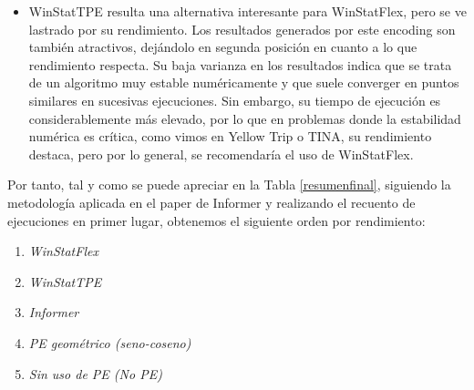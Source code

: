 \begin{itemize}
	 \item WinStatTPE resulta una alternativa interesante para WinStatFlex, pero se ve lastrado por su rendimiento. Los resultados generados por este encoding son también atractivos, dejándolo en segunda posición en cuanto a lo que rendimiento respecta. Su baja varianza en los resultados indica que se trata de un algoritmo muy estable numéricamente y que suele converger en puntos similares en sucesivas ejecuciones. Sin embargo, su tiempo de ejecución es considerablemente más elevado, por lo que en problemas donde la estabilidad numérica es crítica, como vimos en Yellow Trip o TINA, su rendimiento destaca, pero por lo general, se recomendaría el uso de WinStatFlex.
\end{itemize}

Por tanto, tal y como se puede apreciar en la Tabla \ref{resumenfinal}, siguiendo la metodología aplicada en el paper de Informer\cite{zhou2021informerefficienttransformerlong} y realizando el recuento de ejecuciones en primer lugar, obtenemos el siguiente orden por rendimiento:

\begin{enumerate}
	\item \textit{WinStatFlex}
	\item \textit{WinStatTPE}
	\item \textit{Informer}
	\item \textit{PE geométrico (seno-coseno)}
	\item \textit{Sin uso de PE (No PE)}
\end{enumerate}

